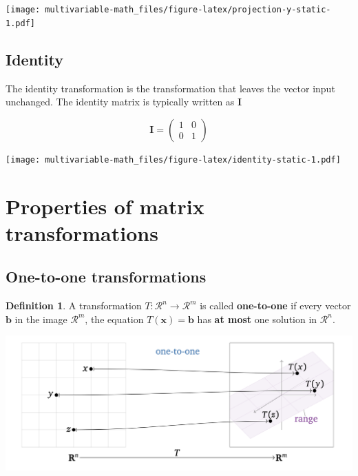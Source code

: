 \documentclass[
]{book}
\theoremstyle{definition}
\newtheorem{definition}{Definition}[chapter]
\theoremstyle{definition}
\theoremstyle{definition}
\theoremstyle{definition}
\theoremstyle{remark}
\begin{document}
\texttt{[image: multivariable-math\_files/figure-latex/projection-y-static-1.pdf]}

\hypertarget{identity}{%
\subsection{Identity}\label{identity}}

The identity transformation is the transformation that leaves the vector input unchanged. The identity matrix is typically written as \(\mathbf{I}\)

\[
\mathbf{I} = \begin{pmatrix}
1 & 0 \\
0 & 1
\end{pmatrix}
\]

\texttt{[image: multivariable-math\_files/figure-latex/identity-static-1.pdf]}

\hypertarget{properties-of-matrix-transformations}{%
\section{Properties of matrix transformations}\label{properties-of-matrix-transformations}}

\hypertarget{one-to-one-transformations}{%
\subsection{One-to-one transformations}\label{one-to-one-transformations}}

\begin{definition}
A transformation \(T:\mathcal{R}^n \rightarrow \mathcal{R}^m\) is called \textbf{one-to-one} if every vector \(\mathbf{b}\) in the image \(\mathcal{R}^m\), the equation \(T(\mathbf{x}) = \mathbf{b}\) has \textbf{at most} one solution in \(\mathcal{R}^n\).
\end{definition}

\includegraphics[width=1\linewidth]{images/one-to-one}
\end{document}
